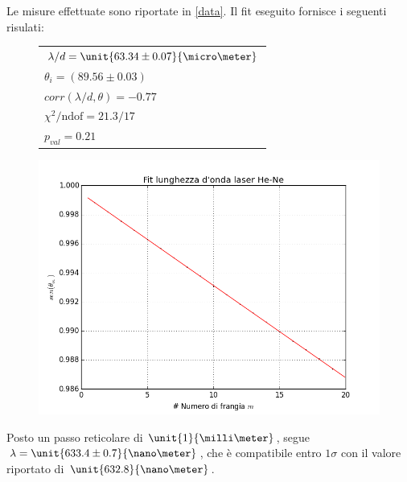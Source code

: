 Le misure effettuate sono riportate in \tablename{ \ref{data}}. Il fit eseguito fornisce i seguenti risulati:
\begin{figure}[H]
	\begin{minipage}{0.25\textwidth}
		\begin{tabular}{l}
			$\lambda/d = \unit{63.34 \pm 0.07}{\micro\meter}$ \\
			$\theta_i = (89.56 \pm 0.03) $\\
			$corr(\lambda/d,\theta) = -0.77$\\
			$\chi^2 /\text{ndof} = 21.3 / 17 $\\
			$p_{val} = 0.21$
		\end{tabular}
	\end{minipage}
	\begin{minipage}{0.8\textwidth}
		\centering
		\includegraphics[width=\textwidth]{./pictures/fit_He-ne.png}
	\end{minipage}
\end{figure}

Posto un passo reticolare di $\unit{1}{\milli\meter}$, segue $\lambda = \unit{633.4 \pm 0.7}{\nano\meter}$, che è compatibile entro $1 \sigma$ con il valore riportato di $\unit{632.8}{\nano\meter}$.